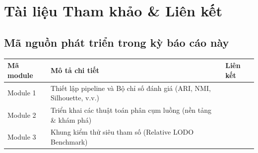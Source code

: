 \section{Tài liệu Tham khảo \& Liên kết}

\subsection*{Mã nguồn phát triển trong kỳ báo cáo này}
\begin{table}[H]
\centering
\small
\begin{tabularx}{\textwidth}{@{}l L l@{}}
\toprule
\textbf{Mã module} & \textbf{Mô tả chi tiết} & \textbf{Liên kết} \\
\midrule
Module 1 & Thiết lập pipeline và Bộ chỉ số đánh giá (ARI, NMI, Silhouette, v.v.) &  \\
Module 2 & Triển khai các thuật toán phân cụm luồng (nền tảng \& khám phá) &  \\
Module 3 & Khung kiểm thử siêu tham số (Relative LODO Benchmark) &  \\
\bottomrule
\end{tabularx}
\end{table}

